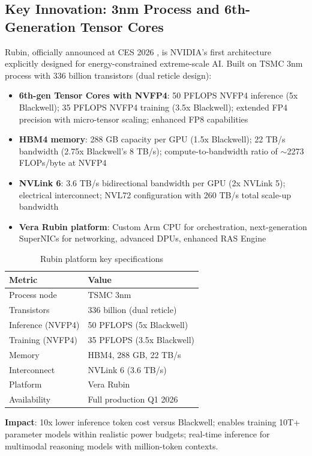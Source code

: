 \documentclass{article}
\begin{document}
\subsection{Key Innovation: 3nm Process and 6th-Generation Tensor Cores}

Rubin, officially announced at CES 2026 \cite{nvidia2024rubin}, is NVIDIA's first architecture explicitly designed for energy-constrained extreme-scale AI. Built on TSMC 3nm process with 336 billion transistors (dual reticle design):

\begin{itemize}
\item \textbf{6th-gen Tensor Cores with NVFP4}: 50 PFLOPS NVFP4 inference (5x Blackwell); 35 PFLOPS NVFP4 training (3.5x Blackwell); extended FP4 precision with micro-tensor scaling; enhanced FP8 capabilities
\item \textbf{HBM4 memory}: 288 GB capacity per GPU (1.5x Blackwell); 22 TB/s bandwidth (2.75x Blackwell's 8 TB/s); compute-to-bandwidth ratio of $\sim$2273 FLOPs/byte at NVFP4
\item \textbf{NVLink 6}: 3.6 TB/s bidirectional bandwidth per GPU (2x NVLink 5); electrical interconnect; NVL72 configuration with 260 TB/s total scale-up bandwidth
\item \textbf{Vera Rubin platform}: Custom Arm CPU for orchestration, next-generation SuperNICs for networking, advanced DPUs, enhanced RAS Engine
\end{itemize}

\begin{table}[h]
\centering\small
\begin{tabular}{ll}
\toprule
Metric & Value \\
\midrule
Process node & TSMC 3nm \\
Transistors & 336 billion (dual reticle) \\
Inference (NVFP4) & 50 PFLOPS (5x Blackwell) \\
Training (NVFP4) & 35 PFLOPS (3.5x Blackwell) \\
Memory & HBM4, 288 GB, 22 TB/s \\
Interconnect & NVLink 6 (3.6 TB/s) \\
Platform & Vera Rubin \\
Availability & Full production Q1 2026 \\
\bottomrule
\end{tabular}
\caption{Rubin platform key specifications}
\end{table}

\textbf{Impact}: 10x lower inference token cost versus Blackwell; enables training 10T+ parameter models within realistic power budgets; real-time inference for multimodal reasoning models with million-token contexts.
\end{document}
